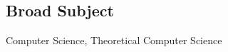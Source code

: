 \documentclass[margin]{res}
\begin{document}
 
\begin{resume}
 
\section{Broad Subject}  Computer Science, Theoretical Computer Science


\end{resume}
\end{document}
